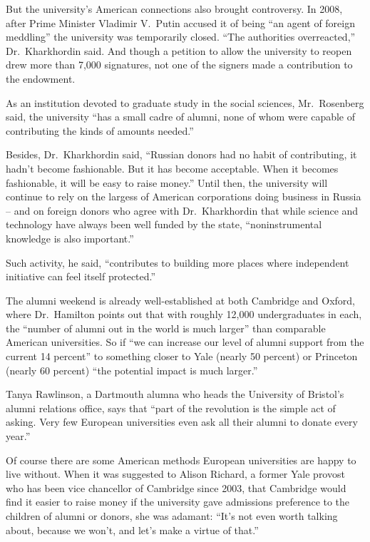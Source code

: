 ﻿\documentclass[12pt]{article}
\begin{document}
But the university's American connections also brought controversy. In 2008, after Prime Minister
Vladimir V.~Putin accused it of being ``an agent of foreign meddling'' the university was
temporarily closed. ``The authorities overreacted,'' Dr.~Kharkhordin said. And though a petition to
allow the university to reopen drew more than 7,000 signatures, not one of the signers made a
contribution to the endowment.

As an institution devoted to graduate study in the social sciences, Mr.~Rosenberg said, the
university ``has a small cadre of alumni, none of whom were capable of contributing the kinds of
amounts needed.''

Besides, Dr.~Kharkhordin said, ``Russian donors had no habit of contributing, it hadn't become
fashionable. But it has become acceptable. When it becomes fashionable, it will be easy to raise
money.'' Until then, the university will continue to rely on the largess of American corporations
doing business in Russia -- and on foreign donors who agree with Dr.~Kharkhordin that while science
and technology have always been well funded by the state, ``noninstrumental knowledge is also
important.''

Such activity, he said, ``contributes to building more places where independent initiative can feel
itself protected.''

The alumni weekend is already well-established at both Cambridge and Oxford, where Dr.~Hamilton
points out that with roughly 12,000 undergraduates in each, the ``number of alumni out in the world
is much larger'' than comparable American universities. So if ``we can increase our level of alumni
support from the current 14 percent'' to something closer to Yale (nearly 50 percent) or Princeton
(nearly 60 percent) ``the potential impact is much larger.''

Tanya Rawlinson, a Dartmouth alumna who heads the University of Bristol's alumni relations office,
says that ``part of the revolution is the simple act of asking. Very few European universities even
ask all their alumni to donate every year.''

Of course there are some American methods European universities are happy to live without. When it
was suggested to Alison Richard, a former Yale provost who has been vice chancellor of Cambridge
since 2003, that Cambridge would find it easier to raise money if the university gave admissions
preference to the children of alumni or donors, she was adamant: ``It's not even worth talking
about, because we won't, and let's make a virtue of that.''
\end{document}

